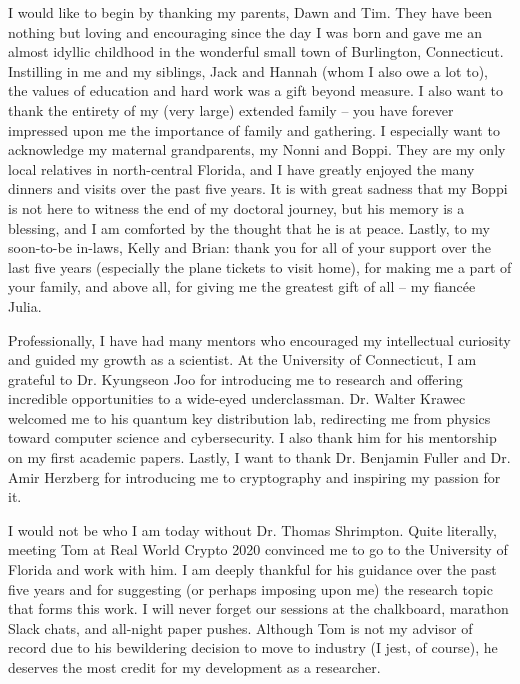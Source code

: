 I would like to begin by thanking my parents, Dawn and Tim. They have been nothing but loving and encouraging since the day I was born and gave me an almost idyllic childhood in the wonderful small town of Burlington, Connecticut. Instilling in me and my siblings, Jack and Hannah (whom I also owe a lot to), the values of education and hard work was a gift beyond measure. I also want to thank the entirety of my (very large) extended family -- you have forever impressed upon me the importance of family and gathering. I especially want to acknowledge my maternal grandparents, my Nonni and Boppi. They are my only local relatives in north-central Florida, and I have greatly enjoyed the many dinners and visits over the past five years. It is with great sadness that my Boppi is not here to witness the end of my doctoral journey, but his memory is a blessing, and I am comforted by the thought that he is at peace. Lastly, to my soon-to-be in-laws, Kelly and Brian: thank you for all of your support over the last five years (especially the plane tickets to visit home), for making me a part of your family, and above all, for giving me the greatest gift of all -- my fiancée Julia.

Professionally, I have had many mentors who encouraged my intellectual curiosity and guided my growth as a scientist. At the University of Connecticut, I am grateful to Dr. Kyungseon Joo for introducing me to research and offering incredible opportunities to a wide-eyed underclassman. Dr. Walter Krawec welcomed me to his quantum key distribution lab, redirecting me from physics toward computer science and cybersecurity. I also thank him for his mentorship on my first academic papers. Lastly, I want to thank Dr. Benjamin Fuller and Dr. Amir Herzberg for introducing me to cryptography and inspiring my passion for it.

I would not be who I am today without Dr. Thomas Shrimpton. Quite literally, meeting Tom at Real World Crypto 2020 convinced me to go to the University of Florida and work with him. I am deeply thankful for his guidance over the past five years and for suggesting (or perhaps imposing upon me) the research topic that forms this work. I will never forget our sessions at the chalkboard, marathon Slack chats, and all-night paper pushes. Although Tom is not my advisor of record due to his bewildering decision to move to industry (I jest, of course), he deserves the most credit for my development as a researcher.

